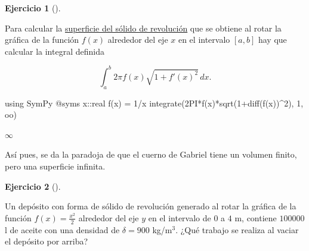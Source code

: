 \documentclass[
  a4paper,
]{scrreport}
\newenvironment{Shaded}{\begin{snugshade}}{\end{snugshade}}
\newcommand{\BuiltInTok}[1]{\textcolor[rgb]{0.00,0.23,0.31}{#1}}
\newcommand{\DataTypeTok}[1]{\textcolor[rgb]{0.68,0.00,0.00}{#1}}
\newcommand{\FloatTok}[1]{\textcolor[rgb]{0.68,0.00,0.00}{#1}}
\newcommand{\FunctionTok}[1]{\textcolor[rgb]{0.28,0.35,0.67}{#1}}
\newcommand{\ImportTok}[1]{\textcolor[rgb]{0.00,0.46,0.62}{#1}}
\newcommand{\NormalTok}[1]{\textcolor[rgb]{0.00,0.23,0.31}{#1}}
\newcommand{\OperatorTok}[1]{\textcolor[rgb]{0.37,0.37,0.37}{#1}}
\newcommand{\PreprocessorTok}[1]{\textcolor[rgb]{0.68,0.00,0.00}{#1}}
\theoremstyle{definition}
\newtheorem{exercise}{Ejercicio}[chapter]
\theoremstyle{remark}
\begin{document}
\begin{exercise}[]
\begin{enumerate}
\begin{tcolorbox}
  Para calcular la
  \href{https://aprendeconalf.es/analisis-manual/09-integrales.html\#c\%C3\%A1lculo-de-superficies-de-s\%C3\%B3lidos-de-revoluci\%C3\%B3n}{superficie
  del sólido de revolución} que se obtiene al rotar la gráfica de la
  función \(f(x)\) alrededor del eje \(x\) en el intervalo \([a,b]\) hay
  que calcular la integral definida

  \[
  \int_a^b 2\pi f(x)\sqrt{1+f'(x)^2}\,dx.
  \]

\begin{Shaded}
\begin{Highlighting}[]
\ImportTok{using} \BuiltInTok{SymPy}
\PreprocessorTok{@syms}\NormalTok{ x}\OperatorTok{::}\DataTypeTok{real}
\FunctionTok{f}\NormalTok{(x) }\OperatorTok{=} \FloatTok{1}\OperatorTok{/}\NormalTok{x}
\FunctionTok{integrate}\NormalTok{(}\FloatTok{2}\FunctionTok{PI*f}\NormalTok{(x)}\FunctionTok{*sqrt}\NormalTok{(}\FloatTok{1}\FunctionTok{+diff}\NormalTok{(}\FunctionTok{f}\NormalTok{(x))}\OperatorTok{\^{}}\FloatTok{2}\NormalTok{), }\FloatTok{1}\NormalTok{, oo)}
\end{Highlighting}
\end{Shaded}

  $\infty$

  Así pues, se da la paradoja de que el cuerno de Gabriel tiene un
  volumen finito, pero una superficie infinita.

  \end{tcolorbox}
\end{enumerate}

\end{exercise}

\begin{exercise}[]\protect\hypertarget{exr-centro-masas}{}\label{exr-centro-masas}

Un depósito con forma de sólido de revolución generado al rotar la
gráfica de la función \(f(x)=\frac{x^2}{2}\) alrededor del eje \(y\) en
el intervalo de \(0\) a \(4\) m, contiene \(100000\) l de aceite con una
densidad de \(\delta = 900\) kg/m\(^3\). ¿Qué trabajo se realiza al
vaciar el depósito por arriba?

\end{exercise}
\end{document}
